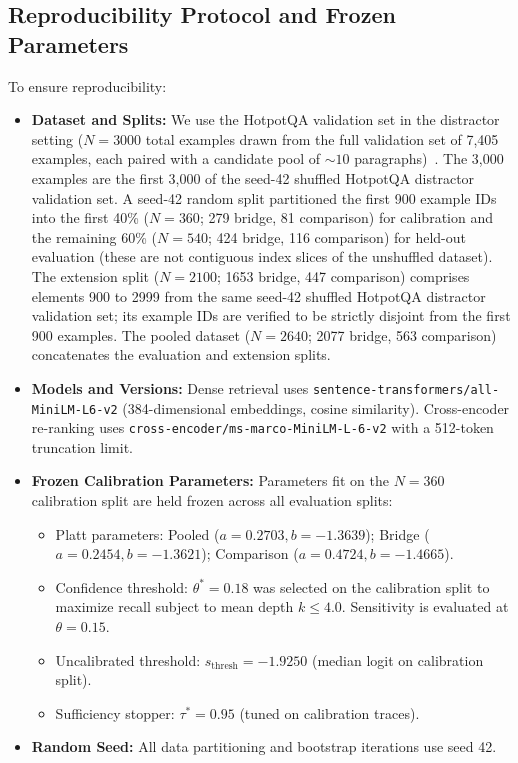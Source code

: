 \documentclass[conference]{IEEEtran}
\begin{document}
\subsection{Reproducibility Protocol and Frozen Parameters}
To ensure reproducibility:
\begin{itemize}
    \item \textbf{Dataset and Splits:} We use the HotpotQA validation set in the distractor setting ($N=3000$ total examples drawn from the full validation set of 7,405 examples, each paired with a candidate pool of $\sim 10$ paragraphs)~\cite{yang2018hotpotqa}. The 3,000 examples are the first 3,000 of the seed-42 shuffled HotpotQA distractor validation set. A seed-42 random split partitioned the first 900 example IDs into the first 40\% ($N=360$; 279 bridge, 81 comparison) for calibration and the remaining 60\% ($N=540$; 424 bridge, 116 comparison) for held-out evaluation (these are not contiguous index slices of the unshuffled dataset). The extension split ($N=2100$; 1653 bridge, 447 comparison) comprises elements 900 to 2999 from the same seed-42 shuffled HotpotQA distractor validation set; its example IDs are verified to be strictly disjoint from the first 900 examples. The pooled dataset ($N=2640$; 2077 bridge, 563 comparison) concatenates the evaluation and extension splits.
    \item \textbf{Models and Versions:} Dense retrieval uses \texttt{sentence-transformers/all-MiniLM-L6-v2} (384-dimensional embeddings, cosine similarity). Cross-encoder re-ranking uses \texttt{cross-encoder/ms-marco-MiniLM-L-6-v2} with a 512-token truncation limit.
    \item \textbf{Frozen Calibration Parameters:} Parameters fit on the $N=360$ calibration split are held frozen across all evaluation splits:
    \begin{itemize}
        \item Platt parameters: Pooled ($a=0.2703, b=-1.3639$); Bridge ($a=0.2454, b=-1.3621$); Comparison ($a=0.4724, b=-1.4665$).
        \item Confidence threshold: $\theta^* = 0.18$ was selected on the calibration split to maximize recall subject to mean depth $k \le 4.0$. Sensitivity is evaluated at $\theta = 0.15$.
        \item Uncalibrated threshold: $s_{\text{thresh}} = -1.9250$ (median logit on calibration split).
        \item Sufficiency stopper: $\tau^* = 0.95$ (tuned on calibration traces).
    \end{itemize}
    \item \textbf{Random Seed:} All data partitioning and bootstrap iterations use seed 42.
\end{itemize}
\end{document}

